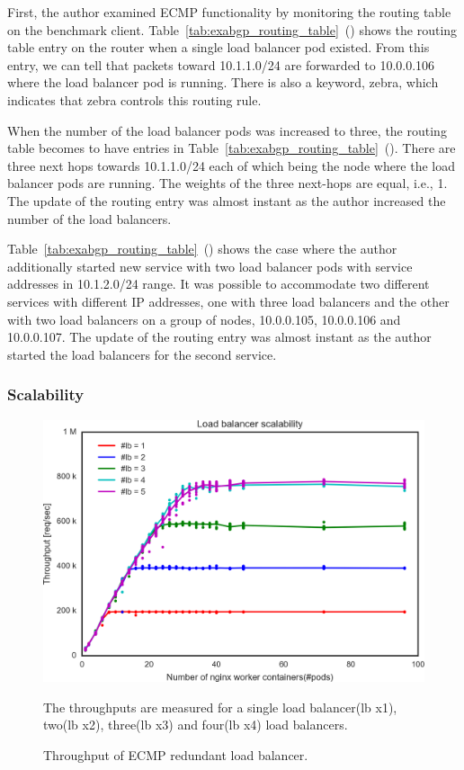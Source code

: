 First, the author examined ECMP functionality by monitoring the routing table on the benchmark client.
Table~\ref{tab:exabgp_routing_table}~() shows the routing table entry on the router when a single load balancer pod existed.
From this entry, we can tell that packets toward 10.1.1.0/24 are forwarded to 10.0.0.106 where the load balancer pod is running.
There is also a keyword, zebra, which indicates that zebra controls this routing rule.

When the number of the load balancer pods was increased to three, the routing table becomes to have entries in Table~\ref{tab:exabgp_routing_table}~().
There are three next hops towards 10.1.1.0/24 each of which being the node where the load balancer pods are running.
The weights of the three next-hops are equal, i.e., 1.
The update of the routing entry was almost instant as the author increased the number of the load balancers.

Table~\ref{tab:exabgp_routing_table}~() shows the case where the author additionally started new service with two load balancer pods with service addresses in 10.1.2.0/24 range.
It was possible to accommodate two different services with different IP addresses, one with three load balancers and the other with two load balancers on a group of nodes, 10.0.0.105, 10.0.0.106 and 10.0.0.107.
The update of the routing entry was almost instant as the author started the load balancers for the second service.

\FloatBarrier

\subsubsection{Scalability}

\begin{figure}[h]
  \includegraphics[width=0.9\columnwidth,left]{Figs/ecmp_lb_cubic}
  \caption{Throughput of ECMP redundant load balancer.}
The throughputs are measured for a single load balancer(lb x1), two(lb x2), three(lb x3) and four(lb x4) load balancers. 

\label{fig:ecmp_lb_cubic}
\end{figure}

